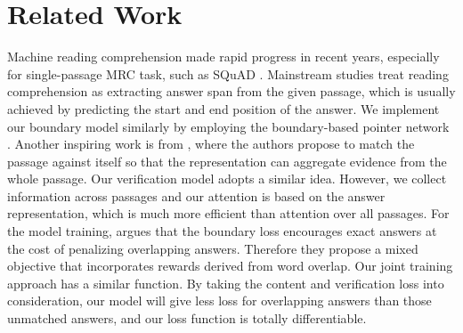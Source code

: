 \section{Related Work}
\label{related}


Machine reading comprehension made rapid progress in recent years, especially for single-passage MRC task, such as SQuAD \cite{squad}. Mainstream studies \cite{bidaf, match-lstm, dcn} treat reading comprehension as extracting answer span from the given passage, which is usually achieved by predicting the start and end position of the answer.  We implement our boundary model similarly by employing the boundary-based pointer network \cite{match-lstm}. Another inspiring work is from , where the authors  propose to match the passage against itself so that the representation can aggregate evidence from the whole passage. Our verification model adopts a similar idea. However, we collect information across passages and our attention is based on the answer representation, which is much more efficient than attention over all passages. For the model training,  argues that  the boundary loss encourages exact answers at the cost of penalizing overlapping answers. Therefore they propose a mixed objective that incorporates rewards derived from word overlap. Our joint training approach has a similar function. By taking the content and verification loss into consideration, our model will give less loss for overlapping answers than those unmatched answers, and our loss function is totally differentiable. 



